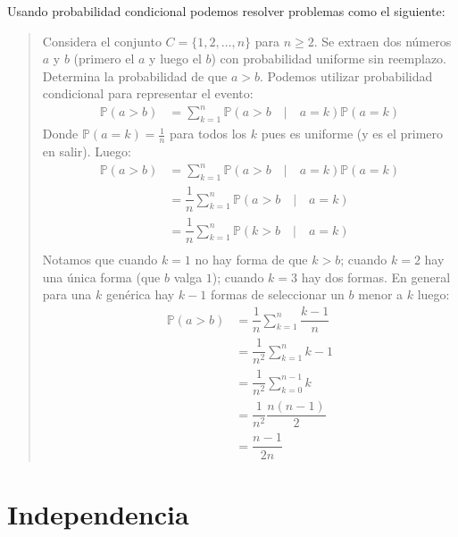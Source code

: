 \documentclass[
]{book}
\begin{document}
Usando probabilidad condicional podemos resolver problemas como el siguiente:

\begin{quote}
Considera el conjunto \(C = \{1,2,\dots, n\}\) para \(n \geq 2\). Se extraen dos números \(a\) y \(b\) (primero el \(a\) y luego el \(b\)) con probabilidad uniforme sin reemplazo. Determina la probabilidad de que \(a > b\).
Podemos utilizar probabilidad condicional para representar el evento:
\begin{equation}\nonumber
\begin{aligned}
\mathbb{P}(a > b) &  = \sum\limits_{k = 1}^{n} \mathbb{P}(a > b \quad |  \quad  a = k) \mathbb{P}(a = k)
\end{aligned}
\end{equation}
Donde \(\mathbb{P}(a = k) = \frac{1}{n}\) para todos los \(k\) pues es uniforme (y es el primero en salir). Luego:
\begin{equation}\nonumber
\begin{aligned}
\mathbb{P}(a > b) &  = \sum\limits_{k = 1}^{n} \mathbb{P}(a > b \quad |  \quad  a = k) \mathbb{P}(a = k) \\
& = \dfrac{1}{n} \sum\limits_{k = 1}^{n} \mathbb{P}(a > b \quad |  \quad  a = k) \\
& = \dfrac{1}{n} \sum\limits_{k = 1}^{n} \mathbb{P}(k > b \quad |  \quad  a = k) \\
\end{aligned}
\end{equation}
Notamos que cuando \(k = 1\) no hay forma de que \(k > b\); cuando \(k = 2\) hay una única forma (que \(b\) valga \(1\)); cuando \(k = 3\) hay dos formas. En general para una \(k\) genérica hay \(k-1\) formas de seleccionar un \(b\) menor a \(k\) luego:
\begin{equation}\nonumber
\begin{aligned}
\mathbb{P}(a > b) &  = \dfrac{1}{n} \sum\limits_{k = 1}^{n} \dfrac{k-1}{n}
\\ & = \dfrac{1}{n^2} \sum\limits_{k = 1}^{n} k-1
\\ & = \dfrac{1}{n^2} \sum\limits_{k = 0}^{n-1} k
\\ & = \dfrac{1}{n^2} \dfrac{n(n-1)}{2}
\\ & = \dfrac{n-1}{2n} 
\end{aligned}
\end{equation}
\end{quote}

\hypertarget{independencia}{%
\section{Independencia}\label{independencia}}
\end{document}
